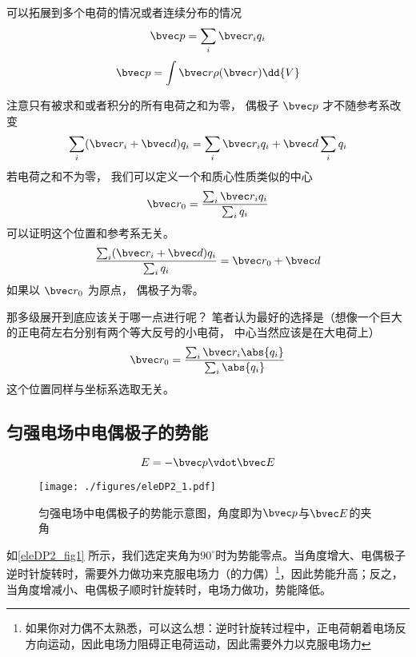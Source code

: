 

可以拓展到多个电荷的情况或者连续分布的情况
\begin{equation}
\bvec p = \sum_i \bvec r_i q_i
\end{equation}
\begin{equation}
\bvec p = \int \bvec r \rho(\bvec r) \dd{V}
\end{equation}

注意只有被求和或者积分的所有电荷之和为零， 偶极子 $\bvec p$ 才不随参考系改变
\begin{equation}
\sum_i (\bvec r_i + \bvec d) q_i = \sum_i \bvec r_i q_i + \bvec d \sum_i q_i
\end{equation}
若电荷之和不为零， 我们可以定义一个和质心性质类似的中心
\begin{equation}
\bvec r_0 = \frac{\sum_i \bvec r_i q_i}{\sum_i q_i}
\end{equation}
可以证明这个位置和参考系无关。
\begin{equation}
\frac{\sum_i (\bvec r_i + \bvec d) q_i}{\sum_i q_i} = \bvec r_0 + \bvec d
\end{equation}
如果以 $\bvec r_0$ 为原点， 偶极子为零。

那多级展开到底应该关于哪一点进行呢？ 笔者认为最好的选择是（想像一个巨大的正电荷左右分别有两个等大反号的小电荷， 中心当然应该是在大电荷上）
\begin{equation}
\bvec r_0 = \frac{\sum_i \bvec r_i \abs{q_i}}{\sum_i \abs{q_i}}
\end{equation}
这个位置同样与坐标系选取无关。

\subsection{匀强电场中电偶极子的势能}
\begin{equation}\label{eleDP2_eq1}
E = -\bvec p \vdot \bvec E
\end{equation}
\begin{figure}[ht]
\centering
\texttt{[image: ./figures/eleDP2\_1.pdf]}
\caption{匀强电场中电偶极子的势能示意图，角度即为$\bvec p$与$\bvec E$的夹角} \label{eleDP2_fig1}
\end{figure}
如\autoref{eleDP2_fig1} 所示，我们选定夹角为$90^\circ$时为势能零点。当角度增大、电偶极子逆时针旋转时，需要外力做功来克服电场力（的力偶）\footnote{如果你对力偶不太熟悉，可以这么想：逆时针旋转过程中，正电荷朝着电场反方向运动，因此电场力阻碍正电荷运动，因此需要外力以克服电场力}，因此势能升高；反之，当角度增减小、电偶极子顺时针旋转时，电场力做功，势能降低。
